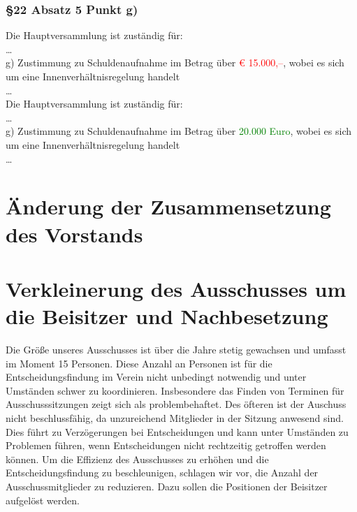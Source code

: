 \documentclass[10pt,a4paper,parskip=half]{scrartcl}
\newcommand{\new}[1]{\textcolor{Green}{#1}}
\newcommand{\old}[1]{\textcolor{Red}{#1}}
\newcommand{\change}[1]{
  \begin{adjustwidth}{20pt}{20pt}
    #1
  \end{adjustwidth}
}
\newcommand{\compare}[3]{\change{\subsubsection*{#1}\begin{multicols}{2}#2\columnbreak\\#3\end{multicols}}}
\begin{document}
  \compare{§22 Absatz 5 Punkt g)}
  {Die Hauptversammlung ist zuständig für: \\ \dots\\g) Zustimmung zu Schuldenaufnahme im Betrag über \old{€ 15.000,--}, wobei es sich um eine Innenverhältnisregelung handelt\\\dots}
  {Die Hauptversammlung ist zuständig für: \\ \dots\\g) Zustimmung zu Schuldenaufnahme im Betrag über \new{20.000 Euro}, wobei es sich um eine Innenverhältnisregelung handelt\\\dots}

  \section{Änderung der Zusammensetzung des Vorstands}
  \label{sec:vorstand}





  \section{Verkleinerung des Ausschusses um die Beisitzer und Nachbesetzung}
  Die Größe unseres Ausschusses ist über die Jahre stetig gewachsen und umfasst im Moment  15 Personen. Diese Anzahl an Personen ist für die Entscheidungsfindung im Verein nicht unbedingt notwendig und unter Umständen schwer zu koordinieren. Insbesondere das Finden von Terminen für Ausschusssitzungen zeigt sich als problembehaftet. Des öfteren ist der Auschuss nicht beschlussfähig, da unzureichend Mitglieder in der Sitzung anwesend sind. Dies führt zu Verzögerungen bei Entscheidungen und kann unter Umständen zu Problemen führen, wenn Entscheidungen nicht rechtzeitig getroffen werden können. Um die Effizienz des Ausschusses zu erhöhen und die Entscheidungsfindung zu beschleunigen, schlagen wir vor, die Anzahl der Ausschussmitglieder zu reduzieren. Dazu sollen die Positionen der Beisitzer aufgelöst werden.
\end{document}
